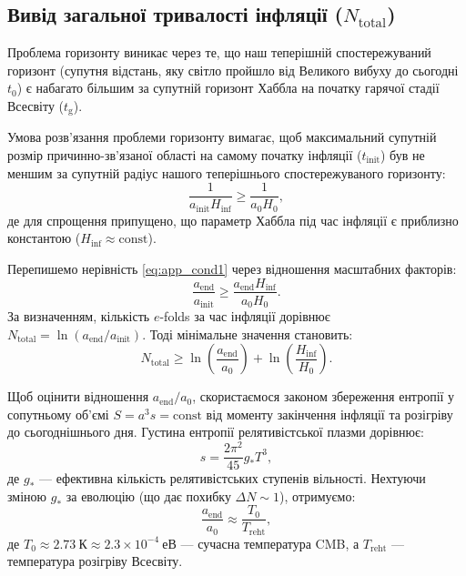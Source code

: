\documentclass[12pt, a4paper]{article}
\begin{document}
\subsection{Вивід загальної тривалості інфляції ($N_{\mathrm{total}}$)}

Проблема горизонту виникає через те, що наш теперішній спостережуваний горизонт (супутня відстань, яку світло пройшло від Великого вибуху до сьогодні $t_0$) є набагато більшим за супутній горизонт Хаббла на початку гарячої стадії Всесвіту ($t_{\mathrm{g}}$).

Умова розв'язання проблеми горизонту вимагає, щоб максимальний супутній розмір причинно-зв'язаної області на самому початку інфляції ($t_{\mathrm{init}}$) був не меншим за супутній радіус нашого теперішнього спостережуваного горизонту:
\begin{equation}
\label{eq:app_cond1}
\frac{1}{a_{\mathrm{init}} H_{\mathrm{inf}}} \ge \frac{1}{a_0 H_0},
\end{equation}
де для спрощення припущено, що параметр Хаббла під час інфляції є приблизно константою ($H_{\mathrm{inf}} \approx \text{const}$).

Перепишемо нерівність \eqref{eq:app_cond1} через відношення масштабних факторів:
\begin{equation}
\label{eq:app_ratio}
\frac{a_{\mathrm{end}}}{a_{\mathrm{init}}} \ge \frac{a_{\mathrm{end}} H_{\mathrm{inf}}}{a_0 H_0}.
\end{equation}
За визначенням, кількість $e$-folds за час інфляції дорівнює $N_{\mathrm{total}} = \ln(a_{\mathrm{end}}/a_{\mathrm{init}})$. Тоді мінімальне значення становить:
\begin{equation}
\label{eq:app_nmin}
  N_{\mathrm{total}} \ge \ln \left( \frac{a_{\mathrm{end}}}{a_0} \right) + \ln \left( \frac{H_{\mathrm{inf}}}{H_0} \right).
\end{equation}

Щоб оцінити відношення $a_{\mathrm{end}}/a_0$, скористаємося законом збереження ентропії у сопутньому об'ємі $S = a^3 s = \text{const}$ від моменту закінчення інфляції та розігріву до сьогоднішнього дня. Густина ентропії релятивістської плазми дорівнює:
\begin{equation}
s = \frac{2\pi^2}{45} g_* T^3,
\end{equation}
де $g_*$ --- ефективна кількість релятивістських ступенів вільності. Нехтуючи зміною $g_*$ за еволюцію (що дає похибку $\Delta N \sim 1$), отримуємо:
\begin{equation}
\label{eq:app_entropy}
\frac{a_{\mathrm{end}}}{a_0} \approx \frac{T_0}{T_{\mathrm{reht}}},
\end{equation}
де $T_0 \approx 2.73~\text{К} \approx 2.3 \times 10^{-4}~\text{еВ}$ --- сучасна температура CMB, а $T_{\mathrm{reht}}$ --- температура розігріву Всесвіту.
\end{document}
